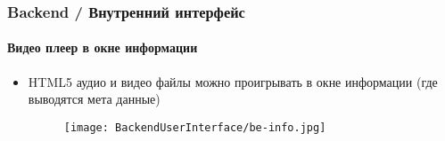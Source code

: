 
\begin{frame}[fragile]
	\frametitle{Backend / Внутренний интерфейс}
	\framesubtitle{Видео плеер в окне информации}
	\begin{itemize}
		\item HTML5 аудио и видео файлы можно проигрывать в окне информации\newline
			(где выводятся мета данные)
		\begin{figure}
			\texttt{[image: BackendUserInterface/be-info.jpg]}
		\end{figure}

	\end{itemize}

\end{frame}

